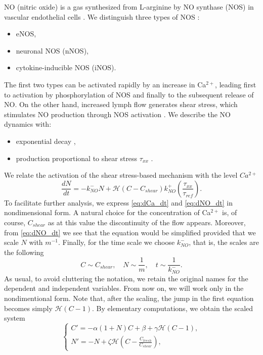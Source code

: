 \documentclass[12pt,a4paper]{article}
\begin{document}
NO (nitric oxide) is a gas synthesized from L-arginine by NO synthase (NOS) in vascular endothelial cells \cite{ohhashi2023physiological}. We distinguish three types of NOS \cite{govers2001cellular}:
 \begin{itemize}
     \item eNOS,
     \item neuronal NOS (nNOS),
     \item cytokine-inducible NOS (iNOS).
 \end{itemize}
The first two types can be activated rapidly by an increase in Ca$^{2+}$, leading first to activation by phosphorylation of NOS and finally to the subsequent release of NO. On the other hand, increased lymph flow generates shear stress, which stimulates NO production through NOS activation \cite{munn2015mechanobiology}. 
We describe the NO dynamics with:
\begin{itemize}
    \item exponential decay \cite{munn2015mechanobiology},
    \item production proportional to shear stress $\tau_{xx}$ \cite{munn2015mechanobiology}.
\end{itemize}
We relate the activation of the shear stress-based mechanism with the level $Ca^{2+}$
\begin{equation}\label{eq:dNO_dt}
    \frac{dN}{dt} = -k_{NO}^{-}N + \mathcal{H}(C - C_{shear}) k_{NO}^{+} \left( \frac{\tau_{xx}}{\tau_{ref}}\right).
\end{equation}
To facilitate further analysis, we express \eqref{eq:dCa_dt} and \eqref{eq:dNO_dt} in nondimensional form. A natural choice for the concentration of Ca$^{2+}$ is, of course, $C_{shear}$ as at this value the discontinuity of the flow appears. Moreover, from \eqref{eq:dNO_dt} we see that the equation would be simplified provided that we scale $N$ with $m^{-1}$. Finally, for the time scale we choose $k_{NO}^{-}$, that is, the scales are the following
\begin{equation}
    C \sim C_{shear}, \quad N \sim \frac{1}{m}, \quad t \sim \frac{1}{k_{NO}^{-}}.
\end{equation}
As usual, to avoid cluttering the notation, we retain the original names for the dependent and independent variables. From now on, we will work only in the nondimentional form. Note that, after the scaling, the jump in the first equation becomes simply $\mathcal{H}(C-1)$. By elementary computations, we obtain the scaled system
\begin{equation}\label{eq:alternative_scaling_system}
    \begin{cases}
        \displaystyle{C' = -\alpha (1+N) C + \beta + \gamma \mathcal{H}(C-1), }\\
        \displaystyle{N' = -N + \zeta \mathcal{H}\left(C-\frac{C_{tresh}}{C_{shear}}\right),}
    \end{cases}
\end{equation}
\end{document}
